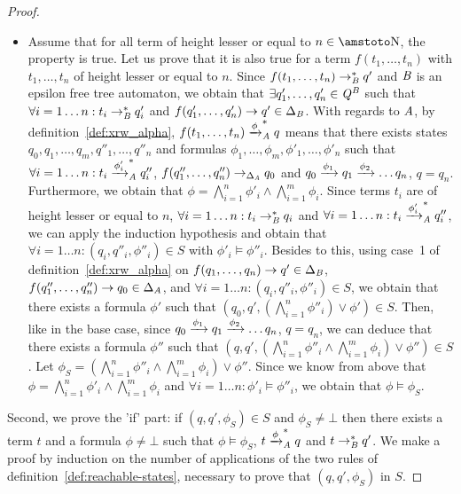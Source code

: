 \begin{proof}
\begin{itemize}
\item Assume that for all term of height lesser or equal to $n\in\NN$, the
  property is true. Let us prove that it is also true for a term $f(t_1, \ldots,
  t_n)$ with $t_1, \ldots, t_n$ of height lesser or equal to $n$. Since $f(t_1,
  \ldots, t_n) \rightarrow^*_\mathit B q'$ and $\mathit B$ is an epsilon free tree automaton, we
  obtain that $\exists q'_1,\ldots,q'_n\in\mathit Q^\mathit B$ such that $\forall i=1\ldots n:
  t_i \rightarrow^*_\mathit B q'_i$ and $f(q'_1,\ldots,q'_n) \rightarrow q' \in \Delta_\mathit B$. With
  regards to $\mathit A$,
  by definition~\ref{def:xrw_alpha}, $f(t_1, \ldots, t_n)
  \xrightarrow{\phi}^*_\mathit A q$ means that there exists states $q_0,q_1, \ldots,
  q_m,q''_1,\ldots,q''_n$ and formulas $\phi_1,\ldots, \phi_m, \phi'_1, \ldots,
  \phi'_n$ such that $\forall i=1\ldots n: t_i \xrightarrow{\phi'_i}^*_\mathit A q''_i$,
  $f(q''_1,\ldots, q''_n) \rightarrow_{\Delta_\mathit A} q_0$ and $q_0 \xrightarrow{\phi_1} q_1
  \xrightarrow{\phi_2} \ldots q_n$, $q=q_n$. Furthermore, we obtain that $\phi=
  \bigwedge_{i=1}^{n} \phi'_i \wedge \bigwedge_{i=1}^{m} \phi_i$. %
  Since terms $t_i$ are of height lesser or equal to $n$, $\forall
  i=1\ldots n: t_i \rightarrow^*_\mathit B q_i$ and $\forall i=1 \ldots n: t_i \xrightarrow{\phi'_i}_\mathit A^*
  q''_i$, we can apply the induction hypothesis and obtain that $\forall
  i=1\ldots n: (q_i, q''_i, \phi''_i) \in S$ with $\phi'_i \models \phi''_i$. %
  Besides to this, using case~1 of definition~\ref{def:xrw_alpha} on
  $f(q_1,\ldots,q_n) \rightarrow q' \in \Delta_\mathit B$, $f(q''_1,\ldots,q''_n) \rightarrow q_0 \in
  \Delta_\mathit A$, and $\forall i=1\ldots n: (q_i, q''_i, \phi''_i) \in S$, we obtain
  that there exists a formula $\phi'$ such that $(q_0,q', (\bigwedge_{i=1}^n
  \phi''_i) \vee \phi')\in S$. Then, like in the base case, since $q_0
  \xrightarrow{\phi_1} q_1 \xrightarrow{\phi_2} \ldots q_n$, $q=q_n$, we can deduce that
  there exists a formula $\phi''$ such that $(q,q',(\bigwedge_{i=1}^n \phi''_i
  \wedge \bigwedge_{i=1}^{m} \phi_i) \vee \phi'')\in S$. Let $\phi_S= (\bigwedge_{i=1}^n \phi''_i
  \wedge \bigwedge_{i=1}^{m} \phi_i) \vee \phi''$. Since we know from above that
  $\phi=\bigwedge_{i=1}^n \phi'_i \wedge \bigwedge_{i=1}^{m} \phi_i$ and
  $\forall i=1\ldots n: \phi'_i \models \phi''_i$, we obtain that %
  $\phi \models \phi_S$.
\end{itemize}


\medskip
Second, we prove the 'if' part: if $(q,q',\phi_S)\in S$ and $\phi_S \neq \bot$
then there exists a term $t$ and a formula $\phi \neq \bot$ such that $\phi \models \phi_S$,
$t\xrightarrow{\phi}^*_\mathit A q$ and $t \rightarrow_\mathit B^* q'$. We make a proof by induction
on the number of applications of the two rules of
definition~\ref{def:reachable-states}, necessary to prove that $(q,q',\phi_S)$ in $S$.


\end{proof}
